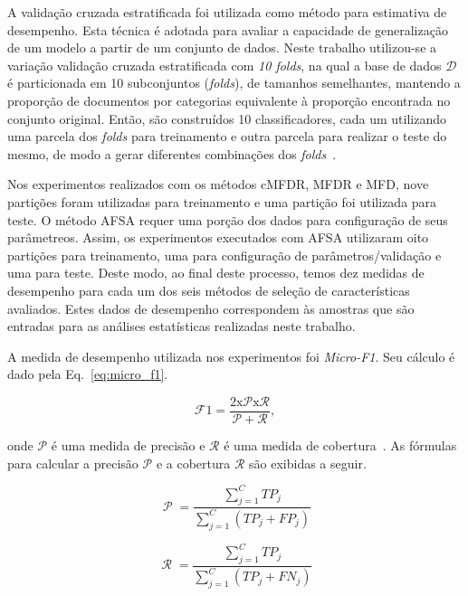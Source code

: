 \documentclass[conference]{IEEEtran}
\begin{document}
A validação cruzada estratificada foi utilizada como método para estimativa de desempenho.
Esta técnica é adotada para avaliar a capacidade de generalização de um modelo a partir de um conjunto de dados.
Neste trabalho utilizou-se a variação validação cruzada estratificada com \emph{10 folds}, na qual a base de dados $\mathcal{D}$ é particionada em 10 subconjuntos (\emph{folds}), de tamanhos semelhantes, mantendo a proporção de documentos por categorias equivalente à proporção encontrada no conjunto original. Então, são construídos 10 classificadores, cada um utilizando uma parcela dos \emph{folds} para treinamento e outra parcela para realizar o teste do mesmo, de modo a gerar diferentes combinações dos \emph{folds}~\cite{kohavi1995study}.

Nos experimentos realizados com os métodos cMFDR, MFDR e MFD, nove partições foram utilizadas para treinamento e uma partição foi utilizada para teste.
O método AFSA requer uma porção dos dados para configuração de seus parâmetreos. Assim, os experimentos executados com AFSA utilizaram oito partições para treinamento, uma para configuração de parâmetros/validação e uma para teste.
Deste modo, ao final deste processo, temos dez medidas de desempenho para cada um dos seis métodos de seleção de características avaliados.
Estes dados de desempenho correspondem às amostras que são entradas para as análises estatísticas realizadas neste trabalho.

A medida de desempenho utilizada nos experimentos foi \textit{Micro-F1}.
Seu cálculo é dado pela Eq.~\ref{eq:micro_f1}.

\begin{equation}
\operatorname{\mathcal{F}{1} = \frac{2 x \mathcal{P} x \mathcal{R}}{\mathcal{P} + \mathcal{R}}},
\label{eq:micro_f1}
\end{equation}

\noindent onde $\mathcal{P}$ é uma medida de precisão e $\mathcal{R}$ é uma medida de cobertura~\cite{chang2008multilabel}. As fórmulas para calcular a precisão $\mathcal{P}$ e a cobertura $\mathcal{R}$ são exibidas a seguir.

\begin{equation}
\operatorname{\mathcal{P}} = \frac{\sum_{j=1}^{C}TP_j}{\sum_{j=1}^{C}(TP_j + FP_j)}
\label{eq:precision}
\end{equation}

\begin{equation}
\operatorname{\mathcal{R}} = \frac{\sum_{j=1}^{C}TP_j}{\sum_{j=1}^{C}(TP_j + FN_j)}
\label{eq:recall}
\end{equation}
\end{document}
